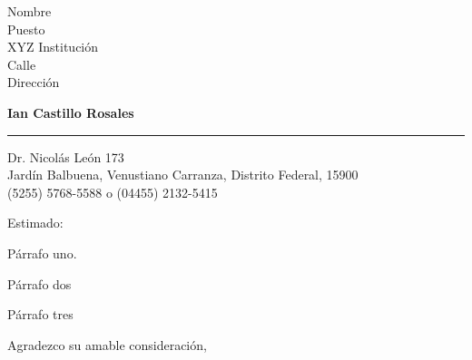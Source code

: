 \documentclass{letter}
\begin{document}
\signature{Ian Castillo Rosales}
\longindentation=0pt
\let\raggedleft\raggedright
 
\begin{letter}{Nombre \\
Puesto \\
XYZ Institución \\
Calle \\
Dirección}

\begin{center}
{\large\bf Ian Castillo Rosales} 
\end{center}
\medskip\hrule height 1pt
\begin{center}
{Dr. Nicolás León 173 \\   Jardín Balbuena, Venustiano Carranza, Distrito Federal, 15900 \\ (5255) 5768-5588 o (04455) 2132-5415} 
\end{center}
 
\vfill
  
\opening{Estimado:} 
 
\noindent Párrafo uno.
 
\noindent Párrafo dos 
 
\noindent Párrafo tres 
 
\closing{Agradezco su amable consideración,} 

\vspace{2cm}
 
\texttt{  }

\end{letter}
 
\end{document}
